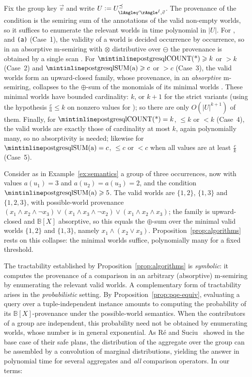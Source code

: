 \begin{proofsketch}
Fix the group key $\vec v$ and write $U\defeq U^{\preceq}_{\angsem{\hat I}{q'},\vec v}$. The provenance of the  condition is the semiring sum of the annotations of the valid non-empty worlds, so it suffices to enumerate the relevant worlds in time polynomial in $|U|$.
For ,  and \texttt{(a)} (Case~1), the validity of a world is decided occurrence by occurrence, so in an absorptive m-semiring with $\otimes$ distributive over $\ominus$ the provenance is obtained by a single scan .
For $\text{\sql{COUNT(*)}}\ge k$ or ${}>k$ (Case~2) and $\text{\sql{SUM(a)}}\ge c$ or ${}>c$ (Case~3), the valid worlds form an upward-closed family, whose provenance, in an \emph{absorptive} m-semiring, collapses to the $\oplus$-sum of the monomials of its minimal worlds . These minimal worlds have bounded cardinality: $k$, or $k+1$ for the strict variants (using the hypothesis $\frac ca\le k$ on nonzero values for ); so there are only $O(|U|^{k+1})$ of them.
Finally, for $\text{\sql{COUNT(*)}}=k$, $\le k$ or $<k$ (Case~4), the valid worlds are exactly those of cardinality at most $k$, again polynomially many, so no absorptivity is needed; likewise for $\text{\sql{SUM(a)}}=c$, $\le c$ or $<c$ when all values are at least $\frac ck$ (Case~5).
\end{proofsketch}

\begin{example}\label{ex:prop-simplification}
Consider as in Example~\ref{ex:semantics} a group of three occurrences,
now with values $a(u_1)=3$ and $a(u_2)=a(u_3)=2$, and the condition
$\text{\sql{SUM(a)}}\ge 5$. The valid worlds are $\{1,2\}$, $\{1,3\}$
and $\{1,2,3\}$, with possible-world provenance
$(x_1\land x_2\land\lnot x_3)\lor(x_1\land x_3\land\lnot x_2)\lor(x_1\land
x_2\land x_3)$; the family is upward-closed and $\mathbb B[X]$
absorptive, so this equals the $\oplus$-sum over the minimal valid
worlds $\{1,2\}$ and $\{1,3\}$, namely $x_1\land(x_2\lor x_3)$.
Proposition~\ref{prop:algorithms} rests on this collapse: the minimal
worlds suffice, polynomially many for a fixed threshold.
\end{example}

The tractability established by Proposition~\ref{prop:algorithms} is
\emph{symbolic}: it computes the provenance of a  comparison in an
arbitrary (absorptive) m-semiring by enumerating the relevant valid worlds. A
complementary form of tractability arises in the \emph{probabilistic} setting. By
Proposition~\ref{prop:pqe-equiv}, evaluating a  query over a
tuple-independent instance amounts to computing the probability of its
$\mathbb{B}[X]$-provenance under the possible-world semantics. When the
contributors of a group are independent, this probability need not be obtained
by enumerating worlds, whose number is in general exponential. As Ré and
Suciu~\cite{re2009trichotomy} showed in the base case of their safe plans,
the distribution of the aggregate over the group can be assembled by a
convolution of marginal distributions, yielding the answer in polynomial
time for several aggregates and \emph{all} comparison operators. In our
terms:

